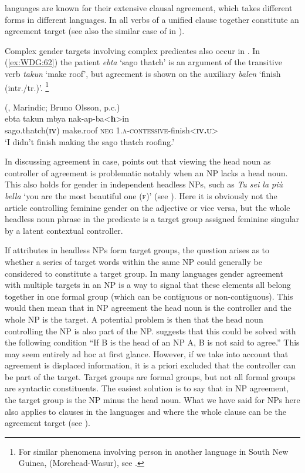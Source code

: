 \documentclass[output=collectionpaper]{langsci/langscibook}
\begin{document}
 languages are known for their extensive clausal agreement, which takes different forms in different languages. In  all verbs of a unified clause together constitute an agreement target (see also the similar case of  in ).

Complex gender targets involving complex predicates also occur in . In (\ref{ex:WDG:62}) the patient \textit{ebta} `sago thatch' is an argument of the transitive verb \textit{takun} `make roof', but agreement is shown on the auxiliary \textit{balen} `finish (intr./tr.)'.%
\footnote{%
For similar phenomena involving person in another language in South New Guinea,  (Morehead-Wasur), see \cite{Evans2015}.
} %

\ea\label{ex:WDG:62}
 (, Marindic; Bruno Olsson, p.c.)\\
\gll ebta	takun	mbya	nak-ap-ba<\textbf{h}>in	\\
sago.thatch(\textbf{\textsc{iv}})	make.roof	\textsc{neg}	1.\textsc{a-contessive}-finish<\textbf{\textsc{iv.u}}>\\
\glt `I didn't finish making the sago thatch roofing.'\\
\z

In discussing agreement in case, \cite[222]{Lehmann1982} points out that viewing the head noun as controller of agreement is problematic notably when an NP lacks a head noun. This also holds for gender in independent headless NPs, such as  \textit{Tu sei la più bella} `you are the most beautiful one (\textsc{f})' (see ). Here it is obviously not the article controlling feminine gender on the adjective or vice versa, but the whole headless noun phrase in the predicate is a target group assigned feminine singular by a latent contextual controller.

If attributes in headless NPs form target groups, the question arises as to whether a series of target words within the same NP could generally be considered to constitute a target group. In many languages gender agreement with multiple targets in an NP is a way to signal that these elements all belong together in one formal group (which can be contiguous or non-contiguous). This would then mean that in NP agreement the head noun is the controller and the whole NP is the target. A potential problem is then that the head noun controlling the NP is also part of the NP. \cite[223]{Lehmann1982} suggests that this could be solved with the following condition ``If B is the head of an NP A, B is not said to agree.'' This may seem entirely ad hoc at first glance. However, if we take into account that agreement is displaced information, it is a priori excluded that the controller can be part of the target. Target groups are formal groups, but not all formal groups are syntactic constituents. The easiest solution is to say that in NP agreement, the target group is the NP minus the head noun. What we have said for NPs here also applies to clauses in the  languages  and  where the whole clause can be the agreement target (see ).
\end{document}
